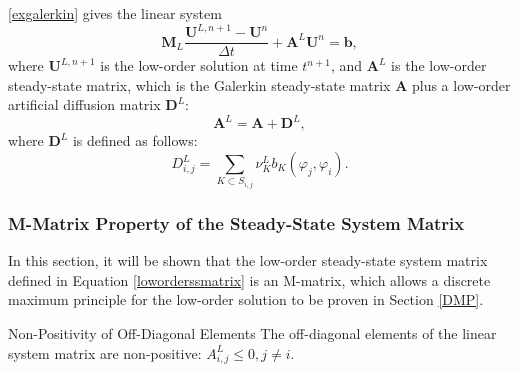 \eqref{exgalerkin} gives the linear system
\begin{equation}
   \mathbf{M}_L\frac{\mathbf{U}^{L,n+1}-\mathbf{U}^n}{\Delta t}
      +\mathbf{A}^L\mathbf{U}^n = \mathbf{b},
\end{equation}
where $\mathbf{U}^{L,n+1}$ is the low-order solution at time $t^{n+1}$, and
$\mathbf{A}^L$ is the low-order steady-state matrix, which is the Galerkin
steady-state matrix $\mathbf{A}$ plus a low-order artificial diffusion matrix
$\mathbf{D}^L$:
\begin{equation}\label{loworderssmatrix}
   \mathbf{A}^L = \mathbf{A} + \mathbf{D}^L,
\end{equation}
where $\mathbf{D}^L$ is defined as follows:
\begin{equation}\label{loworderD}
   D^L_{i,j} = \sum\limits_{K\subset S_{i,j}}\nu_K^L b_K(\varphi_j,\varphi_i).
\end{equation}
\subsubsection{M-Matrix Property of the Steady-State System Matrix}
In this section, it will be shown that the low-order steady-state
system matrix defined in Equation \eqref{loworderssmatrix} is an M-matrix, which
allows a discrete maximum principle for the low-order solution to be proven in
Section \ref{DMP}.
\begin{lemma}[label={offdiagonalnegative_gt}]{Non-Positivity of Off-Diagonal Elements}
   The off-diagonal elements of the linear system matrix are non-positive:
   $A^L_{i,j}\le 0, j\ne i$.
\end{lemma}

